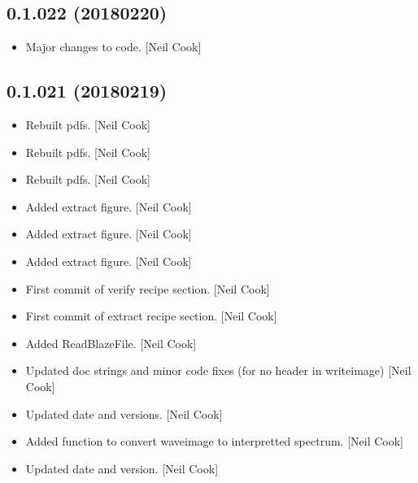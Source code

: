 \documentclass[a4paper,10pt,english]{report}
\begin{document}
\subsection{0.1.022 (2018\sphinxhyphen{}02\sphinxhyphen{}20)}
\label{\detokenize{misc/changelog:id500}}\begin{itemize}
\item {} 
Major changes to code. {[}Neil Cook{]}

\end{itemize}


\subsection{0.1.021 (2018\sphinxhyphen{}02\sphinxhyphen{}19)}
\label{\detokenize{misc/changelog:id501}}\begin{itemize}
\item {} 
Rebuilt pdfs. {[}Neil Cook{]}

\item {} 
Rebuilt pdfs. {[}Neil Cook{]}

\item {} 
Rebuilt pdfs. {[}Neil Cook{]}

\item {} 
Added extract figure. {[}Neil Cook{]}

\item {} 
Added extract figure. {[}Neil Cook{]}

\item {} 
Added extract figure. {[}Neil Cook{]}

\item {} 
First commit of verify recipe section. {[}Neil Cook{]}

\item {} 
First commit of extract recipe section. {[}Neil Cook{]}

\item {} 
Added ReadBlazeFile. {[}Neil Cook{]}

\item {} 
Updated doc strings and minor code fixes (for no header in writeimage)
{[}Neil Cook{]}

\item {} 
Updated date and versions. {[}Neil Cook{]}

\item {} 
Added function to convert waveimage to interpretted spectrum. {[}Neil
Cook{]}

\item {} 
Updated date and version. {[}Neil Cook{]}


\end{itemize}
\end{document}
